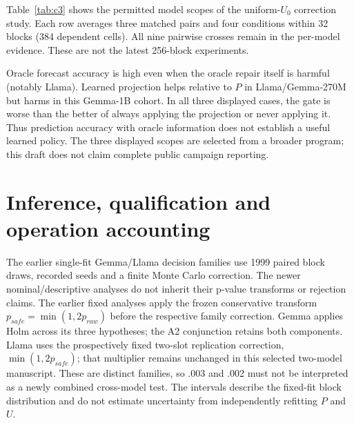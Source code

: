 Table~\ref{tab:c3} shows the permitted model scopes of the uniform-$U_0$ correction study. Each row averages three matched pairs and four conditions within 32 blocks (384 dependent cells). All nine pairwise crosses remain in the per-model evidence. These are not the latest 256-block experiments.
\begin{table}[ht]\centering\scriptsize
{}
\caption{Selected uniform-$U_0$ study; Losses are in squared-logit units; cross-model scales are not a controlled architecture ranking. Gemma-1B is retrospective; Llama/Gemma-270M native responses are prospective.}\label{tab:c3}
\end{table}

Oracle forecast accuracy is high even when the oracle repair itself is harmful (notably Llama). Learned projection helps relative to $P$ in Llama/Gemma-270M but harms in this Gemma-1B cohort. In all three displayed cases, the gate is worse than the better of always applying the projection or never applying it. Thus prediction accuracy with oracle information does not establish a useful learned policy. The three displayed scopes are selected from a broader program; this draft does not claim complete public campaign reporting.

\section{Inference, qualification and operation accounting}

The earlier single-fit Gemma/Llama decision families use 1999 paired block draws, recorded seeds and a finite Monte Carlo correction. The newer nominal/descriptive analyses do not inherit their p-value transforms or rejection claims. The earlier fixed analyses apply the frozen conservative transform $p_{safe}=\min(1,2p_{raw})$ before the respective family correction. Gemma applies Holm across its three hypotheses; the A2 conjunction retains both components. Llama uses the prospectively fixed two-slot replication correction, $\min(1,2p_{safe})$; that multiplier remains unchanged in this selected two-model manuscript. These are distinct families, so .003 and .002 must not be interpreted as a newly combined cross-model test. The intervals describe the fixed-fit block distribution and do not estimate uncertainty from independently refitting $P$ and $U$.

